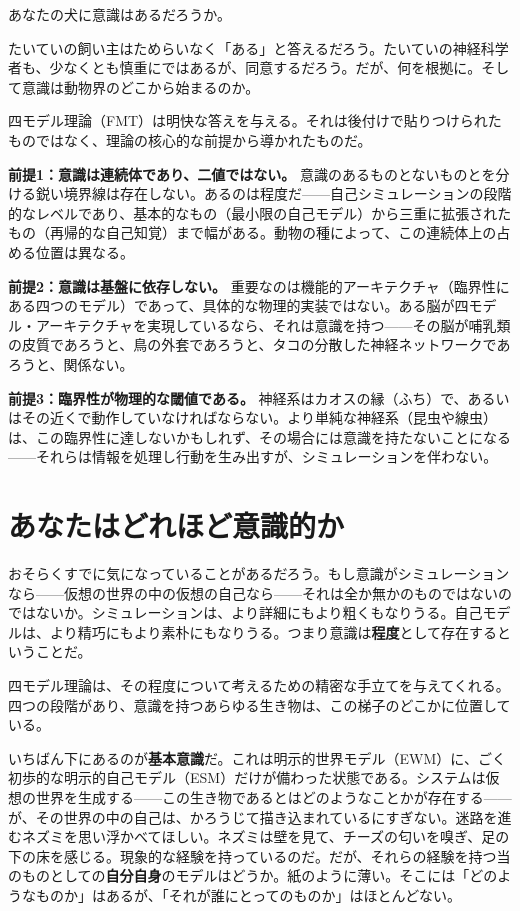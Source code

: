 \documentclass[11pt, twoside, openright]{book}
\begin{document}
あなたの犬に意識はあるだろうか。

たいていの飼い主はためらいなく「ある」と答えるだろう。たいていの神経科学者も、少なくとも慎重にではあるが、同意するだろう。だが、何を根拠に。そして意識は動物界のどこから始まるのか。

四モデル理論（FMT）は明快な答えを与える。それは後付けで貼りつけられたものではなく、理論の核心的な前提から導かれたものだ。

\textbf{前提1：意識は連続体であり、二値ではない。} 意識のあるものとないものとを分ける鋭い境界線は存在しない。あるのは程度だ------自己シミュレーションの段階的なレベルであり、基本的なもの（最小限の自己モデル）から三重に拡張されたもの（再帰的な自己知覚）まで幅がある。動物の種によって、この連続体上の占める位置は異なる。

\textbf{前提2：意識は基盤に依存しない。} 重要なのは機能的アーキテクチャ（臨界性にある四つのモデル）であって、具体的な物理的実装ではない。ある脳が四モデル・アーキテクチャを実現しているなら、それは意識を持つ------その脳が哺乳類の皮質であろうと、鳥の外套であろうと、タコの分散した神経ネットワークであろうと、関係ない。

\textbf{前提3：臨界性が物理的な閾値である。} 神経系はカオスの縁（ふち）で、あるいはその近くで動作していなければならない。より単純な神経系（昆虫や線虫）は、この臨界性に達しないかもしれず、その場合には意識を持たないことになる------それらは情報を処理し行動を生み出すが、シミュレーションを伴わない。

\section*{あなたはどれほど意識的か}

おそらくすでに気になっていることがあるだろう。もし意識がシミュレーションなら------仮想の世界の中の仮想の自己なら------それは全か無かのものではないのではないか。シミュレーションは、より詳細にもより粗くもなりうる。自己モデルは、より精巧にもより素朴にもなりうる。つまり意識は\textbf{程度}として存在するということだ。

四モデル理論は、その程度について考えるための精密な手立てを与えてくれる。四つの段階があり、意識を持つあらゆる生き物は、この梯子のどこかに位置している。

いちばん下にあるのが\textbf{基本意識}だ。これは明示的世界モデル（EWM）に、ごく初歩的な明示的自己モデル（ESM）だけが備わった状態である。システムは仮想の世界を生成する------この生き物であるとはどのようなことかが存在する------が、その世界の中の自己は、かろうじて描き込まれているにすぎない。迷路を進むネズミを思い浮かべてほしい。ネズミは壁を見て、チーズの匂いを嗅ぎ、足の下の床を感じる。現象的な経験を持っているのだ。だが、それらの経験を持つ当のものとしての\textbf{自分自身}のモデルはどうか。紙のように薄い。そこには「どのようなものか」はあるが、「それが誰にとってのものか」はほとんどない。
\end{document}
